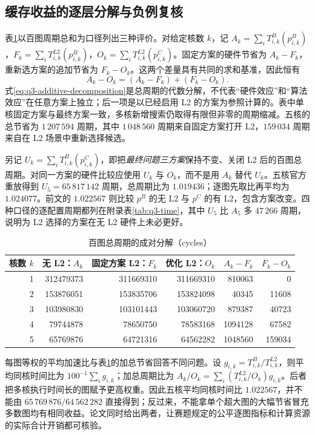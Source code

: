 \subsection{缓存收益的逐层分解与负例复核}
表\ref{tab:q3-total-cycle}以百图周期总和为口径列出三种评价。对给定核数 $k$，记 $A_k=\sum_iT^B_{i,k}(p^B_{i,k})$，$F_k=\sum_iT^{L2}_{i,k}(p^B_{i,k})$，$O_k=\sum_iT^{L2}_{i,k}(p^C_{i,k})$。固定方案的硬件节省为 $A_k-F_k$，重新选方案的追加节省为 $F_k-O_k$。这两个差量具有共同的求和基准，因此恒有
\begin{equation}\label{eq:q3-additive-decomposition}
A_k-O_k=(A_k-F_k)+(F_k-O_k).
\end{equation}
式\eqref{eq:q3-additive-decomposition}是总周期的代数分解，不代表“硬件效应”和“算法效应”在任意方案上独立；后一项是以已经启用 L2 的方案为参照计算的。表中单核固定方案与最终方案一致，多核新增搜索仍取得有限但非零的周期缩减。五核的总节省为 $1\,207\,594$ 周期，其中 $1\,048\,560$ 周期来自固定方案打开 L2，$159\,034$ 周期来自在 L2 场景中重新选择候选。

另记 $U_k=\sum_iT^B_{i,k}(p^C_{i,k})$，即把\emph{最终问题三方案}保持不变、关闭 L2 后的百图总周期。对同一方案的硬件比较应使用 $U_k$ 与 $O_k$，而不是用 $A_k$ 替代 $U_k$。五核官方重放得到 $U_5=65\,817\,142$ 周期，总周期比为 $1.019436$；逐图先取比再平均为 $1.024077$。前文的 $1.022567$ 则比较 $p^B$ 的无 L2 与 $p^C$ 的有 L2，包含方案改变。四种口径的逐配置周期都列在附录表\ref{tab:q3-time}，其中 $U_5$ 比 $A_5$ 多 $47\,266$ 周期，说明为 L2 选择的方案在无 L2 硬件上未必更好。
\begin{table}[!htbp]\centering\small
\caption{百图总周期的成对分解（cycles）}\label{tab:q3-total-cycle}
\begin{tabular}{rrrrrr}
\toprule
核数 $k$ & 无 L2：$A_k$ & 固定方案 L2：$F_k$ & 优化 L2：$O_k$ & $A_k-F_k$ & $F_k-O_k$\\
\midrule
1 & 312479373 & 311669310 & 311669310 & 810063 & 0\\
2 & 153876051 & 153835706 & 153824098 & 40345 & 11608\\
3 & 103980830 & 103101443 & 103060720 & 879387 & 40723\\
4 & 79744878 & 78650750 & 78583168 & 1094128 & 67582\\
5 & 65769876 & 64721316 & 64562282 & 1048560 & 159034\\
\bottomrule
\end{tabular}
\end{table}

每图等权的平均加速比与表\ref{tab:q3-total-cycle}的加总节省回答不同问题。设 $g_{i,k}=T^B_{i,k}/T^{L2}_{i,k}$，则平均同核时间比为 $100^{-1}\sum_i g_{i,k}$；加总周期比为 $A_k/O_k=\sum_i(T^{L2}_{i,k}/O_k)g_{i,k}$。后者把多核执行时间长的图赋予更高权重。因此五核平均同核时间比 $1.022567$，并不能由 $65\,769\,876/64\,562\,282$ 直接得到；反过来，不能拿单个超大图的大幅节省冒充多数图均有相同收益。论文同时给出两者，让赛题规定的公平逐图指标和计算资源的实际合计开销都可核验。

